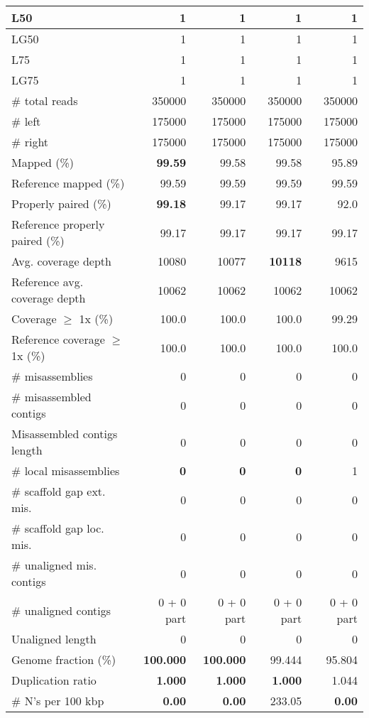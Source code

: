 \documentclass[12pt,a4paper]{article}
\begin{document}
\begin{table}[ht]
\begin{center}
\begin{tabular}{|l*{4}{|r}|}
L50 & 1 & 1 & 1 & 1 \\ \hline
LG50 & 1 & 1 & 1 & 1 \\ \hline
L75 & 1 & 1 & 1 & 1 \\ \hline
LG75 & 1 & 1 & 1 & 1 \\ \hline
\# total reads & 350000 & 350000 & 350000 & 350000 \\ \hline
\# left & 175000 & 175000 & 175000 & 175000 \\ \hline
\# right & 175000 & 175000 & 175000 & 175000 \\ \hline
Mapped (\%) & {\bf 99.59} & 99.58 & 99.58 & 95.89 \\ \hline
Reference mapped (\%) & 99.59 & 99.59 & 99.59 & 99.59 \\ \hline
Properly paired (\%) & {\bf 99.18} & 99.17 & 99.17 & 92.0 \\ \hline
Reference properly paired (\%) & 99.17 & 99.17 & 99.17 & 99.17 \\ \hline
Avg. coverage depth & 10080 & 10077 & {\bf 10118} & 9615 \\ \hline
Reference avg. coverage depth & 10062 & 10062 & 10062 & 10062 \\ \hline
Coverage $\geq$ 1x (\%) & 100.0 & 100.0 & 100.0 & 99.29 \\ \hline
Reference coverage $\geq$ 1x (\%) & 100.0 & 100.0 & 100.0 & 100.0 \\ \hline
\# misassemblies & 0 & 0 & 0 & 0 \\ \hline
\# misassembled contigs & 0 & 0 & 0 & 0 \\ \hline
Misassembled contigs length & 0 & 0 & 0 & 0 \\ \hline
\# local misassemblies & {\bf 0} & {\bf 0} & {\bf 0} & 1 \\ \hline
\# scaffold gap ext. mis. & 0 & 0 & 0 & 0 \\ \hline
\# scaffold gap loc. mis. & 0 & 0 & 0 & 0 \\ \hline
\# unaligned mis. contigs & 0 & 0 & 0 & 0 \\ \hline
\# unaligned contigs & 0 + 0 part & 0 + 0 part & 0 + 0 part & 0 + 0 part \\ \hline
Unaligned length & 0 & 0 & 0 & 0 \\ \hline
Genome fraction (\%) & {\bf 100.000} & {\bf 100.000} & 99.444 & 95.804 \\ \hline
Duplication ratio & {\bf 1.000} & {\bf 1.000} & {\bf 1.000} & 1.044 \\ \hline
\# N's per 100 kbp & {\bf 0.00} & {\bf 0.00} & 233.05 & {\bf 0.00} \\ \hline

\end{tabular}
\end{center}
\end{table}
\end{document}
